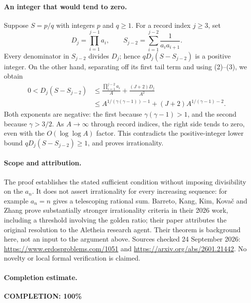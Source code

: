 \paragraph{An integer that would tend to zero.}
Suppose \(S=p/q\) with integers \(p\) and \(q\geq1\). For a record index \(j\geq3\), set
\[
 D_j=\prod_{i=1}^{j-1}a_i,\qquad
 S_{j-2}=\sum_{i=1}^{j-2}\frac1{a_i a_{i+1}}.
\]
Every denominator in \(S_{j-2}\) divides \(D_j\); hence
\(qD_j(S-S_{j-2})\) is a positive integer. On the other hand, separating off its first tail term and using (2)--(3), we obtain
\[
\begin{split}
 0<D_j(S-S_{j-2})
 &\leq
 \frac{\prod_{i=1}^{j-2}a_i}{A}
 +\frac{(J+2)D_j}{A^2}\\
 &\leq
 A^{1/(\gamma(\gamma-1))-1}
 +(J+2)A^{1/(\gamma-1)-2}.
\end{split}
\]
Both exponents are negative: the first because
\(\gamma(\gamma-1)>1\), and the second because \(\gamma>3/2\).
As \(A\to\infty\) through record indices, the right side tends to zero, even with the \(O(\log\log A)\) factor. This contradicts the positive-integer lower bound \(qD_j(S-S_{j-2})\geq1\), and proves irrationality.

\paragraph{Scope and attribution.}
The proof establishes the stated sufficient condition without imposing divisibility on the \(a_n\). It does not assert irrationality for every increasing sequence: for example \(a_n=n\) gives a telescoping rational sum. Barreto, Kang, Kim, Kova\v{c} and Zhang prove substantially stronger irrationality criteria in their 2026 work, including a threshold involving the golden ratio; their paper attributes the original resolution to the Aletheia research agent. Their theorem is background here, not an input to the argument above. Sources checked 24 September 2026: \url{https://www.erdosproblems.com/1051} and \url{https://arxiv.org/abs/2601.21442}. No novelty or local formal verification is claimed.

\paragraph{Completion estimate.}
\textbf{COMPLETION: 100\%}

